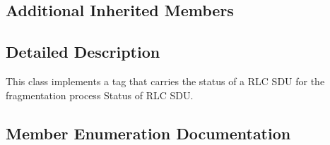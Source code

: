 \subsection*{Additional Inherited Members}


\subsection{Detailed Description}
This class implements a tag that carries the status of a R\+LC S\+DU for the fragmentation process Status of R\+LC S\+DU. 

\subsection{Member Enumeration Documentation}

